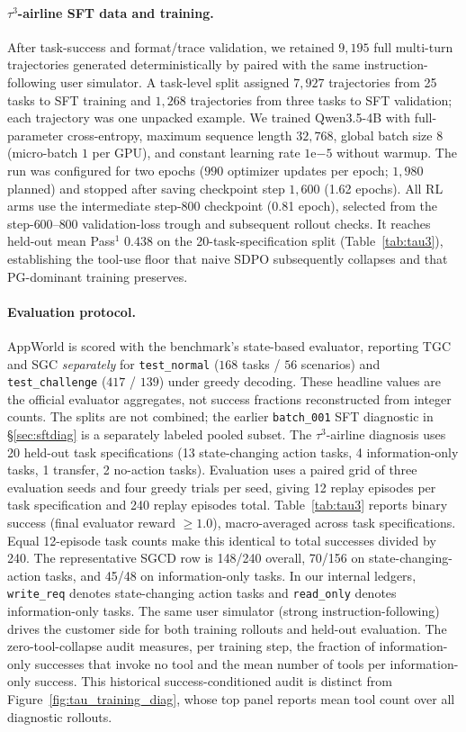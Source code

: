 \paragraph{$\tau^3$-airline SFT data and training.} After task-success and
format/trace validation, we retained $9{,}195$ full multi-turn trajectories
generated deterministically by \sftteacherproviderphrase{} paired with the same
instruction-following user simulator. A task-level split assigned $7{,}927$
trajectories from 25 tasks to SFT training and $1{,}268$ trajectories from three
tasks to SFT validation; each trajectory was one unpacked example. We trained
Qwen3.5-4B with full-parameter cross-entropy, maximum sequence length $32{,}768$,
global batch size $8$ (micro-batch $1$ per GPU), and constant learning rate
$1\mathrm{e}{-5}$ without warmup. The run was configured for two epochs
($990$ optimizer updates per epoch; $1{,}980$ planned) and stopped after saving
checkpoint step $1{,}600$ (1.62 epochs). All RL arms use the intermediate
step-$800$ checkpoint (0.81 epoch), selected from the step-$600$--$800$
validation-loss trough and subsequent rollout checks. It reaches held-out mean
Pass$^1$ $0.438$ on the 20-task-specification split
(Table~\ref{tab:tau3}), establishing the tool-use floor that naive SDPO
subsequently collapses and that PG-dominant training preserves.

\paragraph{Evaluation protocol.} AppWorld is scored with the benchmark's
state-based evaluator, reporting TGC and SGC \emph{separately} for
\texttt{test\_normal} ($168$ tasks / $56$ scenarios) and
\texttt{test\_challenge} ($417$ / $139$) under greedy decoding. These headline
values are the official evaluator aggregates, not success fractions reconstructed
from integer counts. The splits are not combined; the earlier
\texttt{batch\_001} SFT diagnostic in
\S\ref{sec:sftdiag} is a separately labeled pooled subset. The
$\tau^3$-airline diagnosis uses 20 held-out
task specifications (13 state-changing action tasks, 4 information-only tasks,
1 transfer, 2 no-action tasks). Evaluation uses a paired grid of three evaluation seeds
and four greedy trials per seed, giving 12 replay episodes per task specification
and 240 replay episodes total. Table~\ref{tab:tau3} reports binary success
(final evaluator reward $\geq1.0$), macro-averaged across task specifications.
Equal 12-episode task counts make this identical to total successes divided by
240. The representative SGCD row is 148/240 overall, 70/156 on
state-changing-action tasks, and 45/48 on information-only tasks.
In our internal ledgers, \texttt{write\_req} denotes state-changing action
tasks and \texttt{read\_only} denotes information-only tasks.
The same user simulator (strong instruction-following) drives the customer side
for both training rollouts and held-out evaluation. The zero-tool-collapse audit
measures, per training step, the fraction of information-only successes that
invoke no tool and the mean number of tools per information-only success. This
historical success-conditioned audit is distinct from
Figure~\ref{fig:tau_training_diag}, whose top panel reports mean tool count over
all diagnostic rollouts.

